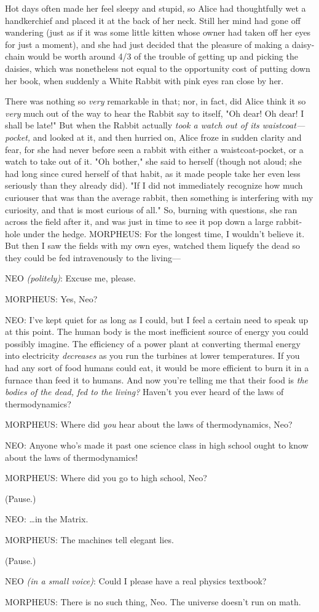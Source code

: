 Hot days often made her feel sleepy and stupid, so Alice had thoughtfully wet a 
handkerchief and placed it at the back of her neck. Still her mind had gone off 
wandering (just as if it was some little kitten whose owner had taken off her 
eyes for just a moment), and she had just decided that the pleasure of making a 
daisy-chain would be worth around 4/3 of the trouble of getting up and picking 
the daisies, which was nonetheless not equal to the opportunity cost of putting 
down her book, when suddenly a White Rabbit with pink eyes ran close by her.

There was nothing so \emph{very} remarkable in that; nor, in fact, did Alice 
think it so \emph{very} much out of the way to hear the Rabbit say to itself, 
"Oh dear! Oh dear! I shall be late!" But when the Rabbit actually \emph{took a 
watch out of its waistcoat---pocket,} and looked at it, and then hurried on, 
Alice froze in sudden clarity and fear, for she had never before seen a rabbit 
with either a waistcoat-pocket, or a watch to take out of it. "Oh bother," she 
said to herself (though not aloud; she had long since cured herself of that 
habit, as it made people take her even less seriously than they already did). 
"If I did not immediately recognize how much curiouser that was than the 
average rabbit, then something is interfering with my curiosity, and that is 
most curious of all." So, burning with questions, she ran across the field 
after it, and was just in time to see it pop down a large rabbit-hole under the 
hedge.
\sbreak
MORPHEUS: For the longest time, I wouldn't believe it. But then I saw the 
fields with my own eyes, watched them liquefy the dead so they could be fed 
intravenously to the living---

NEO \emph{(politely)}: Excuse me, please.

MORPHEUS: Yes, Neo?

NEO: I've kept quiet for as long as I could, but I feel a certain need to speak 
up at this point. The human body is the most inefficient source of energy you 
could possibly imagine. The efficiency of a power plant at converting thermal 
energy into electricity \emph{decreases} as you run the turbines at lower 
temperatures. If you had any sort of food humans could eat, it would be more 
efficient to burn it in a furnace than feed it to humans. And now you're 
telling me that their food is \emph{the bodies of the dead, fed to the living?} 
Haven't you ever heard of the laws of thermodynamics?

MORPHEUS: Where did \emph{you} hear about the laws of thermodynamics, Neo?

NEO: Anyone who's made it past one science class in high school ought to know 
about the laws of thermodynamics!

MORPHEUS: Where did you go to high school, Neo?

(Pause.)

NEO: {\ldots}in the Matrix.

MORPHEUS: The machines tell elegant lies.

(Pause.)

NEO \emph{(in a small voice)}: Could I please have a real physics textbook?

MORPHEUS: There is no such thing, Neo. The universe doesn't run on math.
